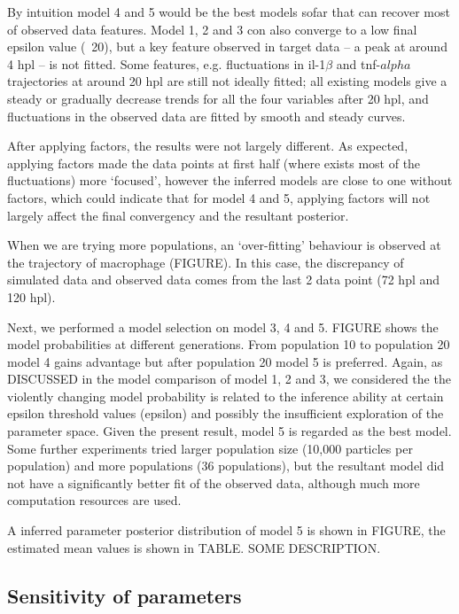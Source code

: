\documentclass[12pt,a4paper]{report}
\begin{document}
By intuition model 4 and 5 would be the best models sofar that can recover most of observed data features. Model 1, 2 and 3 con also converge to a low final epsilon value (~20), but a key feature observed in target data -- a peak at around 4 hpl -- is not fitted. Some features, e.g. fluctuations in il-1$\beta$ and tnf-$alpha$ trajectories at around 20 hpl are still not ideally fitted; all existing models give a steady or gradually decrease trends for all the four variables after 20 hpl, and fluctuations in the observed data are fitted by smooth and steady curves.

After applying factors, the results were not largely different. As expected, applying factors made the data points at first half (where exists most of the fluctuations) more `focused', however the inferred models are close to one without factors, which could indicate that for model 4 and 5, applying factors will not largely affect the final convergency and the resultant posterior.

When we are trying more populations, an `over-fitting' behaviour is observed at the trajectory of macrophage (FIGURE). In this case, the discrepancy of simulated data and observed data comes from the last 2 data point (72 hpl and 120 hpl). 

Next, we performed a model selection on model 3, 4 and 5. FIGURE shows the model probabilities at different generations. From population 10 to population 20 model 4 gains advantage but after population 20 model 5 is preferred. Again, as DISCUSSED in the model comparison of model 1, 2 and 3, we considered the the violently changing model probability is related to the inference ability at certain epsilon threshold values (epsilon) and possibly the insufficient exploration of the parameter space. Given the present result, model 5 is regarded as the best model. Some further experiments tried larger population size (10,000 particles per population) and more populations (36 populations), but the resultant model did not have a significantly better fit of the observed data, although much more computation resources are used.

A inferred parameter posterior distribution of model 5 is shown in FIGURE, the estimated mean values is shown in TABLE. SOME DESCRIPTION.


\subsection{Sensitivity of parameters}
\end{document}
